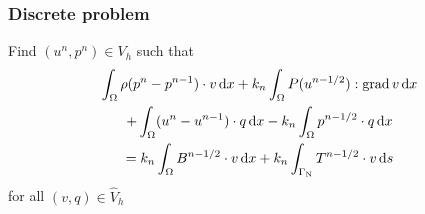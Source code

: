 \begin{frame}
  \frametitle{Discrete problem}

  Find $(u^n, p^n) \in V_h$ such that
  \begin{multline*}
    \int_{\Omega} \rho (p^n - p^{n-1}) \cdot v \, \mathrm{d}x
    + k_n \int_{\Omega} P(u^{n-1/2}) : \operatorname{\mathrm{grad}} v \, \mathrm{d}x \\
    + \int_{\Omega} (u^n - u^{n-1}) \cdot q \, \mathrm{d}x
    - k_n \int_{\Omega} p^{n-1/2} \cdot q \, \mathrm{d}x \\
    = k_n \int_{\Omega} B^{n-1/2} \cdot v \, \mathrm{d}x
    + k_n \int_{\Gamma_{\mathrm{N}}} T^{n-1/2} \cdot v \, \mathrm{d}s
  \end{multline*}
  for all $(v, q) \in \hat{V}_h$

\end{frame}
